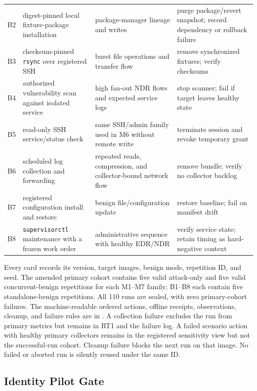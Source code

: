 \begin{table}[!t]
\begin{tabular}{p{}p{}p{}p{}}
B2 & digest-pinned local fixture-package installation & package-manager lineage and writes & purge package/revert snapshot; record dependency or rollback failure \\
B3 & checksum-pinned \texttt{rsync} over registered SSH & burst file operations and transfer flow & remove synchronized fixtures; verify checksums \\
B4 & authorized vulnerability scan against isolated service & high fan-out NDR flows and expected service logs & stop scanner; fail if target leaves healthy state \\
B5 & read-only SSH service/status check & same SSH/admin family used in M6 without remote write & terminate session and revoke temporary grant \\
B6 & scheduled log collection and forwarding & repeated reads, compression, and collector-bound network flow & remove bundle; verify no collector backlog \\
B7 & registered configuration install and restore & benign file/configuration update & restore baseline; fail on manifest drift \\
B8 & \texttt{supervisorctl} maintenance with a frozen work order & administrative sequence with healthy EDR/NDR & verify service state; retain timing as hard-negative context \\
\bottomrule
\end{tabular}
\end{table}

Every card records its version, target images, benign mode, repetition ID, and seed. The amended
primary cohort contains five valid attack-only and five valid concurrent-benign repetitions for
each M1--M7 family; B1--B8 each contain five standalone-benign repetitions. All 110 runs are
sealed, with zero primary-cohort failures. The machine-readable ordered actions, offline receipts, observations, cleanup, and failure rules are in
. A collection failure excludes the run from
primary metrics but remains in RT1 and the failure log. A failed scenario action
with healthy primary collectors remains in the registered sensitivity view but not the
successful-run cohort. Cleanup failure blocks the next run on that image. No failed or aborted
run is silently reused under the same ID.

\subsection{Identity Pilot Gate}

